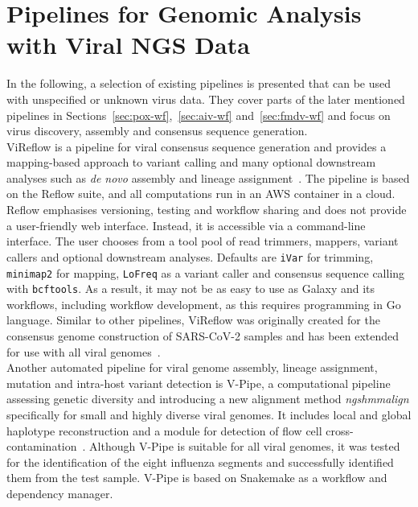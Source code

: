 \section{Pipelines for Genomic Analysis with Viral NGS Data}\label{sec:2-general-pipelines}
In the following, a selection of existing pipelines is presented that can be used with unspecified or unknown virus data. They cover parts of the later mentioned pipelines in Sections~\ref{sec:pox-wf},~\ref{sec:aiv-wf} and~\ref{sec:fmdv-wf} and focus on virus discovery, assembly and consensus sequence generation. \\
ViReflow is a pipeline for viral consensus sequence generation and provides a mapping-based approach to variant calling and many optional downstream analyses such as \textit{de novo} assembly and lineage assignment~\cite{moshiri2022vireflow}. The pipeline is based on the Reflow suite, and all computations run in an \ac{AWS} container in a cloud. Reflow emphasises versioning, testing and workflow sharing and does not provide a user-friendly web interface. Instead, it is accessible via a command-line interface. The user chooses from a tool pool of read trimmers, mappers, variant callers and optional downstream analyses. Defaults are \texttt{iVar} for trimming, \texttt{minimap2} for mapping, \texttt{LoFreq} as a variant caller and consensus sequence calling with \texttt{bcftools}. As a result, it may not be as easy to use as Galaxy and its workflows, including workflow development, as this requires programming in Go language. Similar to other pipelines, ViReflow was originally created for the consensus genome construction of \ac{SARS-CoV-2} samples and has been extended for use with all viral genomes~\cite{moshiri2022vireflow}. \\
Another automated pipeline for viral genome assembly, lineage assignment, mutation and intra-host variant detection is V-Pipe, a computational pipeline assessing genetic diversity and introducing a new alignment method \textit{ngshmmalign} specifically for small and highly diverse viral genomes. It includes local and global haplotype reconstruction and a module for detection of flow cell cross-contamination~\cite{posada2021v}. Although V-Pipe is suitable for all viral genomes, it was tested for the identification of the eight influenza segments and successfully identified them from the test sample. V-Pipe is based on Snakemake as a workflow and dependency manager. \\
